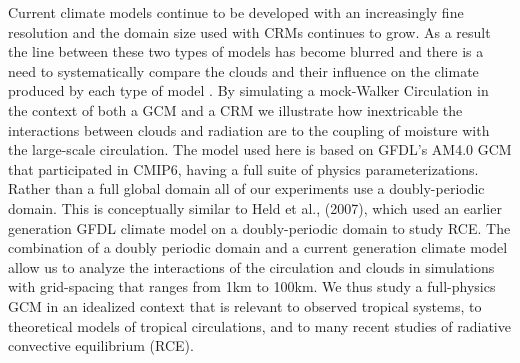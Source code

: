 \documentclass[draft]{agujournal2019}
\begin{document}
Current climate models continue to be developed with an increasingly fine resolution and 
the domain size used with CRMs continues to grow.  
As a result the line between these two types 
of models has become blurred and there is a need to systematically compare the clouds and their 
influence on the climate produced by each type of model \cite{Schneider_etal_2017}.
By simulating a mock-Walker Circulation in the context of both a GCM and a CRM we 
illustrate how inextricable the interactions between clouds and radiation are to the coupling 
of moisture with the large-scale circulation.     
%
%
%
%
The model used here is based on GFDL's AM4.0 GCM that participated in CMIP6, having a full suite of physics parameterizations.  
Rather than a full global domain all of our experiments use a doubly-periodic domain.    
This is conceptually similar to Held et al., (2007), which used an earlier generation GFDL climate model on a doubly-periodic domain to study RCE.   
The combination of a doubly periodic domain and a current generation climate model allow us to analyze the interactions of the 
circulation and clouds in simulations with grid-spacing that ranges from 1km to 100km.  
We thus study a full-physics GCM in an idealized context that is relevant to observed tropical systems, to theoretical
models of  tropical circulations, and to many  recent studies of radiative convective equilibrium (RCE).   
\end{document}

